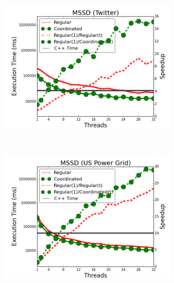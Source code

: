 \begin{figure}[]
\begin{subfigure}[b]{\plotsize\textwidth}
                \label{fig:coordination:coord_unbuffered_sssp_oclinks}
        \end{subfigure} \\
        \begin{subfigure}[b]{\plotsize\textwidth}
                \includegraphics[width=\textwidth]{experiments/coordination/unbuffered-shortest-twitter.png}
                \label{fig:coordination:coord_unbuffered_sssp_twitter}
        \end{subfigure}
        ~
        \begin{subfigure}[b]{\plotsize\textwidth}
                \includegraphics[width=\textwidth]{experiments/coordination/unbuffered-shortest-uspowergrid.png}

\end{subfigure}
\end{figure}
